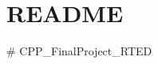 \chapter{README}
\hypertarget{md__2home_2haim_2Desktop_2cpp__Final__Project_2README}{}\label{md__2home_2haim_2Desktop_2cpp__Final__Project_2README}
﻿\# CPP\+\_\+\+Final\+Project\+\_\+\+RTED 